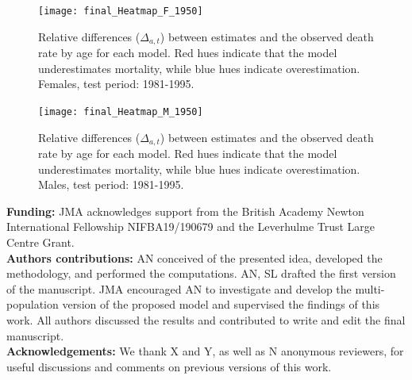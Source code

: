 \documentclass[a4,11pt]{article}
\begin{document}
\begin{figure}[H]
	\centering
	\texttt{[image: final\_Heatmap\_F\_1950]}\\
	 \caption{Relative differences ($\Delta_{a,t}$) between estimates and the observed death rate by age for each model. Red hues indicate that the model underestimates mortality, while blue hues indicate overestimation. Females, test period: 1981-1995.}
	 \label{A:3}
\end{figure}


\begin{figure}[H]
	\centering
	\texttt{[image: final\_Heatmap\_M\_1950]}\\
	 \caption{Relative differences ($\Delta_{a,t}$) between estimates and the observed death rate by age for each model. Red hues indicate that the model underestimates mortality, while blue hues indicate overestimation. Males, test period: 1981-1995.}
	 \label{A:4}
\end{figure}

\noindent
\textbf{Funding:} JMA acknowledges support from the British Academy Newton International Fellowship NIFBA19/190679 and the Leverhulme Trust Large Centre Grant.\\

\noindent
\textbf{Authors contributions:} AN conceived of the presented idea, developed the methodology, and performed the computations. AN, SL drafted the first version of the manuscript. JMA encouraged AN to investigate and develop the multi-population version of the proposed model and supervised the findings of this work. 
All authors discussed the results and contributed to write and edit the final manuscript.\\

\noindent
\textbf{Acknowledgements:} We thank X and Y, as well as N anonymous reviewers, for useful discussions and comments on previous versions of this work.
\end{document}

